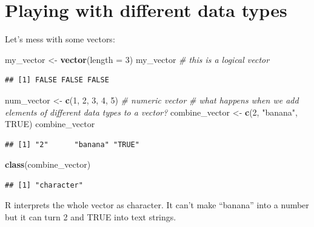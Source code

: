 \documentclass[
]{book}
\newenvironment{Shaded}{\begin{snugshade}}{\end{snugshade}}
\newcommand{\AttributeTok}[1]{\textcolor[rgb]{0.13,0.29,0.53}{#1}}
\newcommand{\CommentTok}[1]{\textcolor[rgb]{0.56,0.35,0.01}{\textit{#1}}}
\newcommand{\ConstantTok}[1]{\textcolor[rgb]{0.56,0.35,0.01}{#1}}
\newcommand{\DecValTok}[1]{\textcolor[rgb]{0.00,0.00,0.81}{#1}}
\newcommand{\FunctionTok}[1]{\textcolor[rgb]{0.13,0.29,0.53}{\textbf{#1}}}
\newcommand{\NormalTok}[1]{#1}
\newcommand{\OtherTok}[1]{\textcolor[rgb]{0.56,0.35,0.01}{#1}}
\newcommand{\StringTok}[1]{\textcolor[rgb]{0.31,0.60,0.02}{#1}}
\begin{document}
\section{Playing with different data types}\label{playing-with-different-data-types}

Let's mess with some vectors:

\begin{Shaded}
\begin{Highlighting}[]
\NormalTok{my\_vector }\OtherTok{\textless{}{-}} \FunctionTok{vector}\NormalTok{(}\AttributeTok{length =} \DecValTok{3}\NormalTok{)}
\NormalTok{my\_vector  }\CommentTok{\# this is a logical vector}
\end{Highlighting}
\end{Shaded}

\begin{verbatim}
## [1] FALSE FALSE FALSE
\end{verbatim}

\begin{Shaded}
\begin{Highlighting}[]
\NormalTok{num\_vector }\OtherTok{\textless{}{-}} \FunctionTok{c}\NormalTok{(}\DecValTok{1}\NormalTok{, }\DecValTok{2}\NormalTok{, }\DecValTok{3}\NormalTok{, }\DecValTok{4}\NormalTok{, }\DecValTok{5}\NormalTok{) }\CommentTok{\# numeric vector}
\CommentTok{\# what happens when we add elements of different data types to a vector?}
\NormalTok{combine\_vector }\OtherTok{\textless{}{-}} \FunctionTok{c}\NormalTok{(}\DecValTok{2}\NormalTok{, }\StringTok{"banana"}\NormalTok{, }\ConstantTok{TRUE}\NormalTok{)}
\NormalTok{combine\_vector}
\end{Highlighting}
\end{Shaded}

\begin{verbatim}
## [1] "2"      "banana" "TRUE"
\end{verbatim}

\begin{Shaded}
\begin{Highlighting}[]
\FunctionTok{class}\NormalTok{(combine\_vector) }
\end{Highlighting}
\end{Shaded}

\begin{verbatim}
## [1] "character"
\end{verbatim}

R interprets the whole vector as character. It can't make ``banana'' into a number but it can turn 2 and TRUE into text strings.
\end{document}
